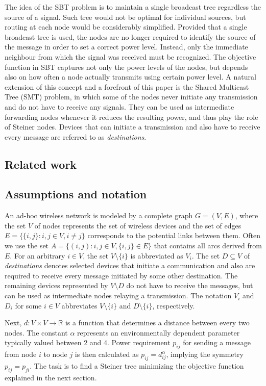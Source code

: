The idea of the SBT problem is to maintain a single broadcast tree regardless the source of a signal. Such tree would not be optimal for individual sources, but routing at each node would be considerably simplified. Provided that a single broadcast tree is used, the nodes are no longer required to identify the source of the message in order to set a correct power level. Instead, only the immediate neighbour from which the signal was received must be recognized. The objective function in SBT captures not only the power levels of the nodes, but depends also on how often a node actually transmits using certain power level. A natural extension of this concept and a forefront of this paper is the Shared Multicast Tree (SMT) problem, in which some of the nodes never initiate any transmission and do not have to receive any signals. They can be used as intermediate forwarding nodes whenever it reduces the resulting power, and thus play the role of Steiner nodes. Devices that can initiate a transmission and also have to receive every message are referred to as \emph{destinations}.

\subsection{Related work}
\subsection{Assumptions and notation}
An ad-hoc wireless network is modeled by a complete graph $G=(V,E)$, where the set $V$ of nodes represents the set of wireless devices and the set of edges $E=\{\{i,j\}:i,j\in V, i\neq j\}$ corresponds to the potential links between them. Often we use the set $A=\{(i,j):i,j\in V,\{i,j\}\in E\}$ that contains all arcs derived from $E$. For an arbitrary $i\in V$, the set $V\setminus \{i\}$ is abbreviated as $V_i$. The set $D\subseteq V$ of \emph{destinations} denotes selected devices that initiate a communication and also are required to receive every message initiated by some other destination. The remaining devices represented by $V\setminus D$ do not have to receive the messages, but can be used as intermediate nodes relaying a transmission. The notation $V_i$ and $D_i$ for some $i\in V$ abbreviates $V\setminus\{i\}$ and $D\setminus\{i\}$, respectively. 

Next, $d: V\times V\rightarrow \mathbb{R}$ is a function that determines a distance between every two nodes. The constant $\alpha$ represents an environmentally dependent parameter typically valued between 2 and 4. Power requirement $p_{ij}$ for sending a message from node $i$ to node $j$ is then calculated as $p_{ij}=d^{\alpha}_{ij}$, implying the symmetry $p_{ij}=p_{ji}$. The task is to find a Steiner tree minimizing the objective function explained in the next section.

